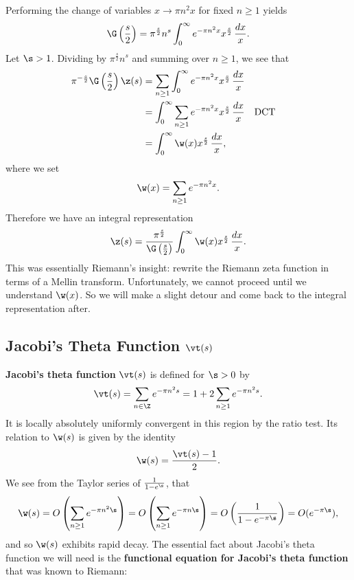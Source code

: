       Performing the change of variables $x \to \pi n^{2}x$ for fixed $n \ge 1$ yields
      \begin{equation}\label{equ:gamma_integral_substitution}
        \G\left(\frac{s}{2}\right) = \pi^{\frac{s}{2}} n^{s}\int_{0}^{\infty}e^{-\pi n^{2}x}x^{\frac{s}{2}}\,\frac{dx}{x}.
      \end{equation}
      Let $\s > 1$. Dividing by $\pi^{\frac{s}{2}}n^{s}$ and summing over $n \ge 1$, we see that
      \begin{align*}
        \pi^{-\frac{s}{2}}\G\left(\frac{s}{2}\right)\z(s) &= \sum_{n \ge 1}\int_{0}^{\infty}e^{-\pi n^{2}x}x^{\frac{s}{2}}\,\frac{dx}{x} \\
        &= \int_{0}^{\infty}\sum_{n \ge 1}e^{-\pi n^{2}x}x^{\frac{s}{2}}\,\frac{dx}{x} && \text{DCT} \\
        &= \int_{0}^{\infty}\w(x)x^{\frac{s}{2}}\,\frac{dx}{x},
      \end{align*}
      where we set
      \[
        \w(x) = \sum_{n \ge 1}e^{-\pi n^{2}x}.
      \]
      Therefore we have an integral representation
      \begin{equation}\label{equ:integral_representation_zeta_1}
        \z(s) = \frac{\pi^{\frac{s}{2}}}{\G\left(\frac{s}{2}\right)}\int_{0}^{\infty}\w(x)x^{\frac{s}{2}}\,\frac{dx}{x}.
      \end{equation}
      This was essentially Riemann's insight: rewrite the Riemann zeta function in terms of a Mellin transform. Unfortunately, we cannot proceed until we understand $\w(x)$. So we will make a slight detour and come back to the integral representation after.
    \subsection*{Jacobi's Theta Function \texorpdfstring{$\vt(s)$}{\vt(s)}}
      \textbf{Jacobi's theta function} $\vt(s)$ is defined for $\s > 0$ by
      \[
        \vt(s) = \sum_{n \in \Z}e^{-\pi n^{2}s} = 1+2\sum_{n \ge 1}e^{-\pi n^{2}s}.
      \]
      It is locally absolutely uniformly convergent in this region by the ratio test. Its relation to $\w(s)$ is given by the identity
      \begin{equation}\label{equ:omega_theta_relationship_for_zeta}
        \w(s) = \frac{\vt(s)-1}{2}.
      \end{equation}
      We see from the Taylor series of $\frac{1}{1-e^{\s}}$, that
      \[
        \w(s) = O\left(\sum_{n \ge 1}e^{-\pi n^{2}\s}\right) = O\left(\sum_{n \ge 1}e^{-\pi n\s}\right) = O\left(\frac{1}{1-e^{-\pi\s}}\right) = O(e^{-\pi\s}),
      \]
      and so $\w(s)$ exhibits rapid decay. The essential fact about Jacobi's theta function we will need is the \textbf{functional equation for Jacobi's theta function} that was known to Riemann:

